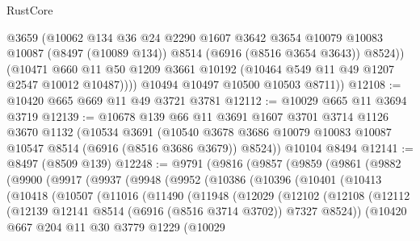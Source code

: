 \begin{lexlean}{RustCore}
\begin{coremodule}
              @3659
              (@10062
                @134
                @36
                @24
                @2290
                @1607
                @3642
                @3654
                @10079
                @10083
                @10087
                (@8497 (@10089 @134))
                @8514
                (@6916 (@8516 @3654 @3643))
                @8524))
            (@10471
              @660
              @11
              @50
              @1209
              @3661
              @10192
              (@10464 @549 @11 @49 @1207 @2547 @10012 @10487))))
        @10494
        @10497
        @10500
        @10503
        @8711))
@12108 := @10420 @665 @669 @11 @49 @3721 @3781
@12112 := @10029 @665 @11 @3694 @3719
@12139 := @10678
    @139
    @66
    @11
    @3691
    @1607
    @3701
    @3714
    @1126
    @3670
    @1132
    (@10534
      @3691
      (@10540 @3678 @3686 @10079 @10083 @10087 @10547 @8514 (@6916 (@8516 @3686 @3679)) @8524))
    @10104
    @8494
@12141 := @8497 (@8509 @139)
@12248 := @9791
    (@9816
      (@9857
        (@9859
          (@9861
            (@9882
              (@9900
                (@9917
                  (@9937
                    (@9948
                      (@9952
                        (@10386
                          (@10396
                            (@10401
                              (@10413
                                (@10418
                                  (@10507
                                    (@11016
                                      (@11490
                                        (@11948
                                          (@12029
                                            (@12102
                                              (@12108
                                                (@12112
                                                  (@12139
                                                    @12141
                                                    @8514
                                                    (@6916 (@8516 @3714 @3702))
                                                    @7327
                                                    @8524))
                                                (@10420
                                                  @667
                                                  @204
                                                  @11
                                                  @30
                                                  @3779
                                                  @1229
                                                  (@10029

\end{coremodule}
\end{lexlean}
